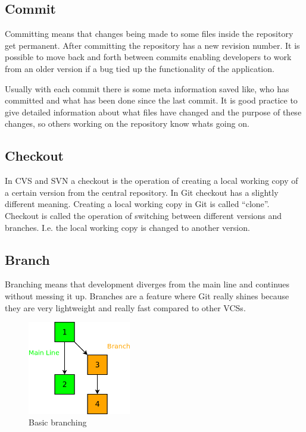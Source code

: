 \subsection{Commit}

Committing means that changes being made to some files inside the repository get permanent. 
After committing the repository has a new revision number. It is possible to move back and forth between commits enabling developers to work 
from an older version if a bug tied up the functionality of the application.

Usually with each commit there is some meta information saved like, who has committed and what has been done since the last commit. 
It is good practice to give detailed information about what files have changed and the purpose of these changes, so others working 
on the repository know whats going on.


\subsection{Checkout}

In CVS and SVN a checkout is the operation of creating a local working copy of a certain version from the 
central repository. In Git checkout has a slightly different meaning. Creating a local working copy in Git is 
called “clone”. \cite[chapter 2.1]{gitpro2009} Checkout is called the operation of switching between different versions and branches. I.e. 
the local working copy is changed to another version. \cite[chapter 3.2]{gitpro2009}


\subsection{Branch}

Branching means that development diverges from the main line and continues without messing it up. Branches are a feature where Git really shines 
because they are very lightweight and really fast compared to other VCSs. \cite[chapter 3]{gitpro2009}

\begin{figure}[ht]
  \centering
  \includegraphics[width=0.4\textwidth]{img/Gen_Branch}
  \caption{Basic branching}
  \label{fig:gen_branch} 
\end{figure}

